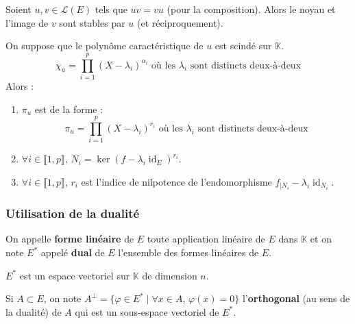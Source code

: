 	\begin{proposition}
		Soient $u, v \in \mathcal{L}(E)$ tels que $uv = vu$ (pour la composition). Alors le noyau et l'image de $v$ sont stables par $u$ (et réciproquement).
	\end{proposition}


	\begin{proposition}
		On suppose que le polynôme caractéristique de $u$ est scindé sur $\mathbb{K}$.
		\[ \chi_u = \prod_{i=1}^p (X - \lambda_i)^{\alpha_i} \text{ où les } \lambda_i \text{ sont distincts deux-à-deux} \]
		Alors :
		\begin{enumerate}[label=(\roman*)]
			\item $\pi_u$ est de la forme :
			\[ \pi_u = \prod_{i=1}^p (X - \lambda_i)^{r_i} \text{ où les } \lambda_i \text{ sont distincts deux-à-deux} \]
			\item $\forall i \in \llbracket 1, p \rrbracket$, $N_i = \ker{(f - \lambda_i \operatorname{id}_E )^{r_i}}$.
			\item $\forall i \in \llbracket 1, p \rrbracket$, $r_i$ est l'indice de nilpotence de l'endomorphisme $f_{|N_i} - \lambda_i \operatorname{id}_{N_i}$.
		\end{enumerate}
	\end{proposition}

	\subsubsection{Utilisation de la dualité}

	\reference[GOU21]{132}

	\begin{definition}
		On appelle \textbf{forme linéaire} de $E$ toute application linéaire de $E$ dans $\mathbb{K}$ et on note $E^*$ appelé \textbf{dual} de $E$ l'ensemble des formes linéaires de $E$.
	\end{definition}

	\begin{proposition}
		$E^*$ est un espace vectoriel sur $\mathbb{K}$ de dimension $n$.
	\end{proposition}

	\begin{definition}
		Si $A \subset E$, on note $A^\perp = \{ \varphi \in E^* \mid \forall x \in A, \, \varphi(x) = 0 \}$ l'\textbf{orthogonal} (au sens de la dualité) de $A$ qui est un sous-espace vectoriel de $E^*$.
	\end{definition}

